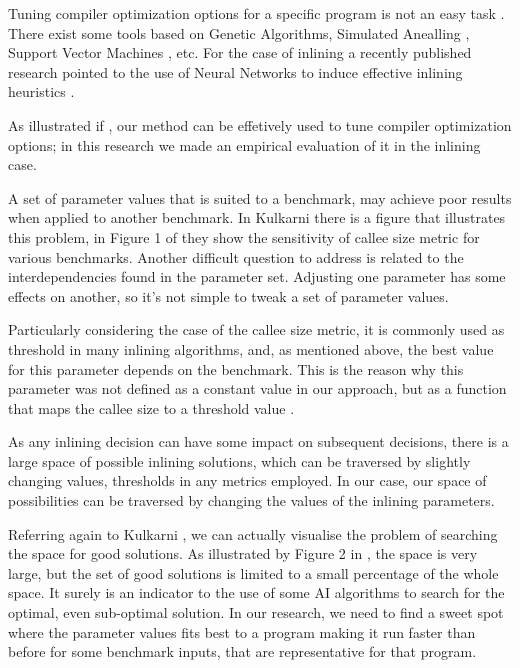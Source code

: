 Tuning compiler optimization options for a specific program is not an easy
task \cite{Zhong2009}. There exist some tools based on Genetic Algorithms,
Simulated Anealling \cite{Zhong2009}, Support Vector Machines \cite{SanchezCGO11},
etc. For the case of inlining a recently published research pointed to the
use of Neural Networks to induce effective inlining heuristics \cite{KulkarniCGO13}.

As illustrated if , our method can be effetively used
to tune compiler optimization options; in this research we made an empirical
evaluation of it in the inlining case.

A set of parameter values that is suited to a benchmark, may achieve poor
results when applied to another benchmark. In Kulkarni \etal there
is a figure that illustrates this problem, in Figure 1 of \cite{KulkarniCGO13}
they show the sensitivity of callee size metric for various benchmarks.
Another difficult question to address is related to the interdependencies
found in the parameter set. Adjusting one parameter has some effects on
another, so it's not simple to tweak a set of parameter values.

Particularly considering the case of the callee size metric, it is commonly
used as threshold in many inlining algorithms, and, as mentioned above, the
best value for this parameter depends on the benchmark. This is the reason why
this parameter was not defined as a constant value in our approach, but as a
function that maps the callee size to a threshold value \cite{BerubePhD}.

As any inlining decision can have some impact on subsequent decisions, there
is a large space of possible inlining solutions, which can be traversed by
slightly changing values, thresholds in any metrics employed. In our case,
our space of possibilities can be traversed by changing the values of the
inlining parameters.

Referring again to Kulkarni \etal, we can actually visualise the problem
of searching the space for good solutions. As illustrated by Figure 2
in \cite{KulkarniCGO13}, the space is very large, but the set of good
solutions is limited to a small percentage of the whole space. It surely
is an indicator to the use of some AI algorithms to search for the optimal,
even sub-optimal solution. In our research, we need to find a sweet spot
where the parameter values fits best to a program making it run faster
than before for some benchmark inputs, that are representative for that
program.

